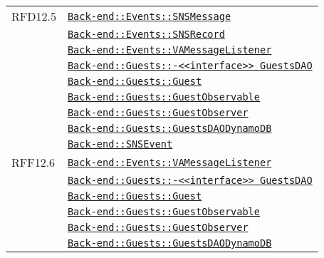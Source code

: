 \begin{longtable}{|>{\centering}m{3cm}|m{10cm}<{\centering}|}
RFD12.5 & \hyperref[Back-end::Events::SNSMessage]{\texttt{Back-end::Events::SNSMessage}}\\
& \hyperref[Back-end::Events::SNSRecord]{\texttt{Back-end::Events::SNSRecord}}\\
& \hyperref[Back-end::Events::VAMessageListener]{\texttt{Back-end::Events::VAMessageListener}}\\
& \hyperref[Back-end::Guests::<<interface>> GuestsDAO]{\texttt{Back-end::Guests::-\linebreak <<interface>> GuestsDAO}}\\
& \hyperref[Back-end::Guests::Guest]{\texttt{Back-end::Guests::Guest}}\\
& \hyperref[Back-end::Guests::GuestObservable]{\texttt{Back-end::Guests::GuestObservable}}\\
& \hyperref[Back-end::Guests::GuestObserver]{\texttt{Back-end::Guests::GuestObserver}}\\
& \hyperref[Back-end::Guests::GuestsDAODynamoDB]{\texttt{Back-end::Guests::GuestsDAODynamoDB}}\\
& \hyperref[Back-end::SNSEvent]{\texttt{Back-end::SNSEvent}}\\ \hline

RFF12.6 & \hyperref[Back-end::Events::VAMessageListener]{\texttt{Back-end::Events::VAMessageListener}}\\
& \hyperref[Back-end::Guests::<<interface>> GuestsDAO]{\texttt{Back-end::Guests::-\linebreak <<interface>> GuestsDAO}}\\
& \hyperref[Back-end::Guests::Guest]{\texttt{Back-end::Guests::Guest}}\\
& \hyperref[Back-end::Guests::GuestObservable]{\texttt{Back-end::Guests::GuestObservable}}\\
& \hyperref[Back-end::Guests::GuestObserver]{\texttt{Back-end::Guests::GuestObserver}}\\
& \hyperref[Back-end::Guests::GuestsDAODynamoDB]{\texttt{Back-end::Guests::GuestsDAODynamoDB}}\\ \hline


\end{longtable}
